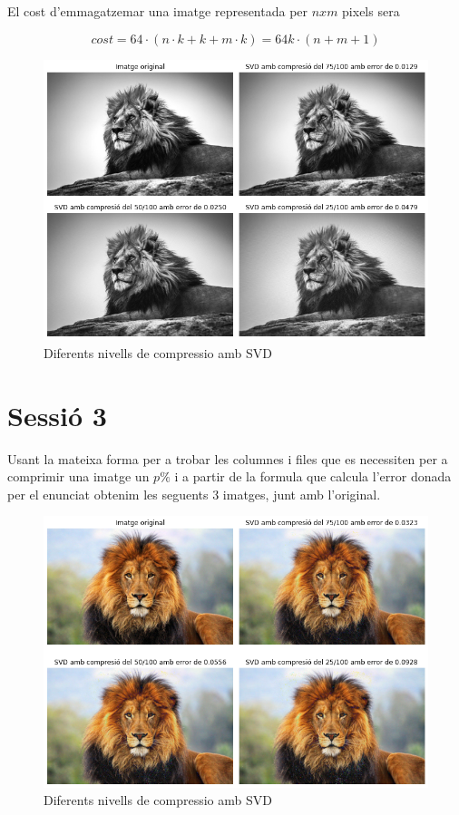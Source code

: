 \documentclass[12pt, a4papre]{article}
\begin{document}
	El cost d'emmagatzemar una imatge representada per $nxm$ pixels sera
	
	\[
		cost = 64\cdot (n\cdot k + k + m\cdot k) = 64 k\cdot (n + m + 1) 
	\]
	
	\begin{figure}[H]
		\begin{center}
		\includegraphics[width=130mm]{img_3_2.png}
		\caption{Diferents nivells de compressio amb SVD}
		\end{center}
	\end{figure}
	\newpage
	
	\section{Sessió 3}
	
	Usant la mateixa forma per a trobar les columnes i files que es necessiten per a comprimir una imatge un $p\%$ i a partir de la formula que calcula l'error donada per el enunciat obtenim les seguents 3 imatges, junt amb l'original.
	
	\begin{figure}[H]
		\begin{center}
		\includegraphics[width=130mm]{img_3_3.png}
		\caption{Diferents nivells de compressio amb SVD}
		\end{center}
	\end{figure}
	
	
\end{document}
